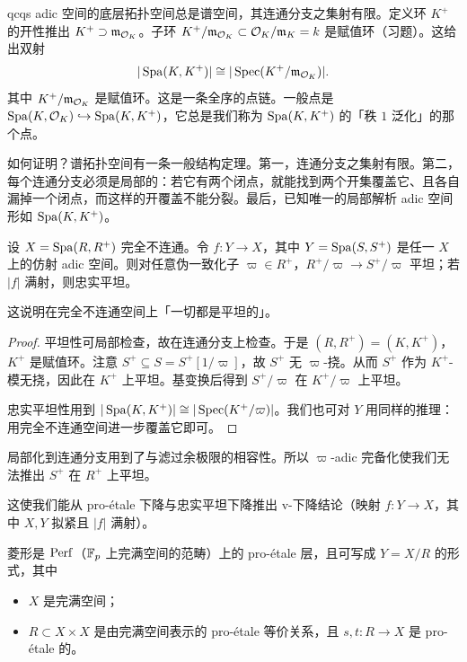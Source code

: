 \begin{remark}
qcqs adic 空间的底层拓扑空间总是谱空间，其连通分支之集射有限。定义环 $K^+$ 的开性推出 $K^+\supset\mathfrak m_{\mathcal{O}_K}$。子环 $K^+/\mathfrak m_{\mathcal{O}_K}\subset\mathcal{O}_K/\mathfrak m_K=k$ 是赋值环（习题）。这给出双射
\[
|\operatorname{Spa}(K,K^+)|\cong|\operatorname{Spec}(K^+/\mathfrak m_{\mathcal{O}_K})|.
\]
其中 $K^+/\mathfrak m_{\mathcal{O}_K}$ 是赋值环。这是一条全序的点链。一般点是 $\operatorname{Spa}(K,\mathcal{O}_K)\hookrightarrow\operatorname{Spa}(K,K^+)$，它总是我们称为 $\operatorname{Spa}(K,K^+)$ 的「秩 $1$ 泛化」的那个点。
\end{remark}

如何证明？谱拓扑空间有一条一般结构定理。第一，连通分支之集射有限。第二，每个连通分支必须是局部的：若它有两个闭点，就能找到两个开集覆盖它、且各自漏掉一个闭点，而这样的开覆盖不能分裂。最后，已知唯一的局部解析 adic 空间形如 $\operatorname{Spa}(K,K^+)$。

\begin{corollary}
设 $X=\operatorname{Spa}(R,R^+)$ 完全不连通。令 $f\colon Y\to X$，其中 $Y=\operatorname{Spa}(S,S^+)$ 是任一 $X$ 上的仿射 adic 空间。则对任意伪一致化子 $\varpi\in R^+$，$R^+/\varpi\to S^+/\varpi$ 平坦；若 $|f|$ 满射，则忠实平坦。
\end{corollary}

这说明在完全不连通空间上「一切都是平坦的」。


\begin{proof}
平坦性可局部检查，故在连通分支上检查。于是 $(R,R^+)=(K,K^+)$，$K^+$ 是赋值环。注意 $S^+\subseteq S=S^+[1/\varpi]$，故 $S^+$ 无 $\varpi$-挠。从而 $S^+$ 作为 $K^+$-模无挠，因此在 $K^+$ 上平坦。基变换后得到 $S^+/\varpi$ 在 $K^+/\varpi$ 上平坦。

忠实平坦性用到 $|\operatorname{Spa}(K,K^+)|\cong|\operatorname{Spec}(K^+/\varpi)|$。我们也可对 $Y$ 用同样的推理：用完全不连通空间进一步覆盖它即可。
\end{proof}

\begin{remark}
局部化到连通分支用到了与滤过余极限的相容性。所以 $\varpi$-adic 完备化使我们无法推出 $S^+$ 在 $R^+$ 上平坦。
\end{remark}

这使我们能从 pro-étale 下降与忠实平坦下降推出 v-下降结论（映射 $f\colon Y\to X$，其中 $X,Y$ 拟紧且 $|f|$ 满射）。

\begin{definition}
菱形是 $\mathrm{Perf}$（$\mathbb{F}_p$ 上完满空间的范畴）上的 pro-étale 层，且可写成 $Y=X/R$ 的形式，其中
\begin{itemize}
\item $X$ 是完满空间；
\item $R\subset X\times X$ 是由完满空间表示的 pro-étale 等价关系，且 $s,t\colon R\to X$ 是 pro-étale 的。
\end{itemize}
\end{definition}

